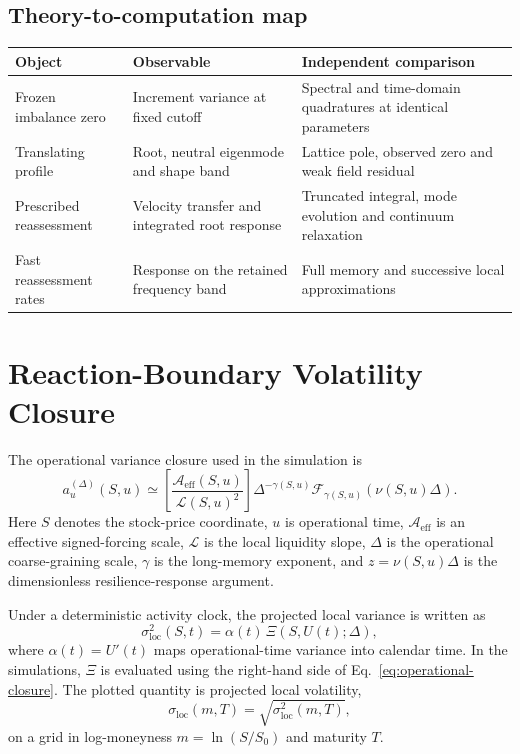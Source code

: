 \documentclass[11pt]{article}
\newcommand{\Aeff}{\mathcal A_{\mathrm{eff}}}
\newcommand{\Liq}{\mathcal L}
\newcommand{\Fresp}{\mathcal F}
\newcommand{\sigloc}{\sigma_{\mathrm{loc}}}
\begin{document}
\subsection{Theory-to-computation map}
\begin{center}
\small
\begin{tabular}{p{.23\linewidth}p{.31\linewidth}p{.36\linewidth}}
\toprule
Object & Observable & Independent comparison \\
\midrule
Frozen imbalance zero & Increment variance at fixed cutoff & Spectral and time-domain quadratures at identical parameters \\
Translating profile & Root, neutral eigenmode and shape band & Lattice pole, observed zero and weak field residual \\
Prescribed reassessment & Velocity transfer and integrated root response & Truncated integral, mode evolution and continuum relaxation \\
Fast reassessment rates & Response on the retained frequency band & Full memory and successive local approximations \\
\bottomrule
\end{tabular}
\end{center}

\section{Reaction-Boundary Volatility Closure}

The operational variance closure used in the simulation is
\begin{equation}
 a_u^{(\Delta)}(S,u)
 \simeq
 \left[
 \frac{\Aeff(S,u)}
      {\Liq(S,u)^2}
 \right]
 \Delta^{-\gamma(S,u)}
 \Fresp_{\gamma(S,u)}\!\left(\nu(S,u)\Delta\right).
 \label{eq:operational-closure}
\end{equation}
Here \(S\) denotes the stock-price coordinate, \(u\) is operational time,
\(\Aeff\) is an effective signed-forcing scale, \(\Liq\) is the local
liquidity slope, \(\Delta\) is the operational coarse-graining scale,
\(\gamma\) is the long-memory exponent, and
\(z=\nu(S,u)\Delta\) is the dimensionless resilience-response argument.

Under a deterministic activity clock, the projected local variance is written
as
\begin{equation}
 \sigloc^2(S,t)
 =
 \alpha(t)\,
 \Xi(S,U(t);\Delta),
 \label{eq:projected-local-variance}
\end{equation}
where \(\alpha(t)=U'(t)\) maps operational-time variance into calendar time. In the
simulations, \(\Xi\) is evaluated using the right-hand side of
Eq.~\eqref{eq:operational-closure}. The plotted quantity is projected local
volatility,
\begin{equation}
 \sigloc(m,T)=\sqrt{\sigloc^2(m,T)},
 \label{eq:plotted-volatility}
\end{equation}
on a grid in log-moneyness \(m=\ln(S/S_0)\) and maturity \(T\).
\end{document}

